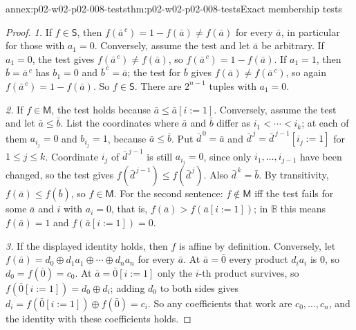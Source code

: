 \begin{annexitem}{annex:p02-w02-p02-008-tests}{thm:p02-w02-p02-008-tests}{Exact membership tests}
\begin{proof}
\emph{1.}  If \(f\in\mathsf S\), then \(f(\bar a^{\,c})=1-f(\bar a)\neq
f(\bar a)\) for every \(\bar a\), in particular for those with \(a_1=0\).
Conversely, assume the test and let \(\bar a\) be arbitrary.  If \(a_1=0\),
the test gives \(f(\bar a^{\,c})\neq f(\bar a)\), so
\(f(\bar a^{\,c})=1-f(\bar a)\).  If \(a_1=1\), then
\(\bar b=\bar a^{\,c}\) has \(b_1=0\) and \(\bar b^{\,c}=\bar a\); the test
for \(\bar b\) gives \(f(\bar a)\neq f(\bar a^{\,c})\), so again
\(f(\bar a^{\,c})=1-f(\bar a)\).  So \(f\in\mathsf S\).  There are
\(2^{n-1}\) tuples with \(a_1=0\).

\emph{2.}  If \(f\in\mathsf M\), the test holds because
\(\bar a\leq\bar a[i{:=}1]\).  Conversely, assume the test and let
\(\bar a\leq\bar b\).  List the coordinates where \(\bar a\) and \(\bar b\)
differ as \(i_1<\cdots<i_k\); at each of them \(a_{i_j}=0\) and
\(b_{i_j}=1\), because \(\bar a\leq\bar b\).  Put \(\bar d^{\,0}=\bar a\) and
\(\bar d^{\,j}=\bar d^{\,j-1}[i_j{:=}1]\) for \(1\leq j\leq k\).  Coordinate
\(i_j\) of \(\bar d^{\,j-1}\) is still \(a_{i_j}=0\), since only
\(i_1,\ldots,i_{j-1}\) have been changed, so the test gives
\(f(\bar d^{\,j-1})\leq f(\bar d^{\,j})\).  Also \(\bar d^{\,k}=\bar b\).
By transitivity, \(f(\bar a)\leq f(\bar b)\), so \(f\in\mathsf M\).  For the
second sentence: \(f\notin\mathsf M\) iff the test fails for some \(\bar a\)
and \(i\) with \(a_i=0\), that is, \(f(\bar a)>f(\bar a[i{:=}1])\); in
\(\mathbb B\) this means \(f(\bar a)=1\) and \(f(\bar a[i{:=}1])=0\).

\emph{3.}  If the displayed identity holds, then \(f\) is affine by
definition.  Conversely, let
\(f(\bar a)=d_0\oplus d_1a_1\oplus\cdots\oplus d_na_n\) for every \(\bar a\).
At \(\bar a=\bar0\) every product \(d_ia_i\) is \(0\), so \(d_0=f(\bar0)=c_0\).
At \(\bar a=\bar0[i{:=}1]\) only the \(i\)-th product survives, so
\(f(\bar0[i{:=}1])=d_0\oplus d_i\); adding \(d_0\) to both sides gives
\(d_i=f(\bar0[i{:=}1])\oplus f(\bar0)=c_i\).  So any coefficients that work
are \(c_0,\ldots,c_n\), and the identity with these coefficients holds.
\end{proof}
\end{annexitem}

